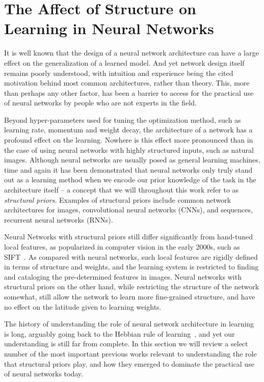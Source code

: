 \documentclass[thesis]{subfiles}
\begin{document}
	\chapter{The Affect of Structure on Learning in Neural Networks}
	\label{motivation}
	
	It is well known that the design of a neural network architecture can have a large effect on the generalization of a learned model. And yet network design itself remains poorly understood, with intuition and experience being the cited motivation behind most common architectures, rather than theory. This, more than perhaps any other factor, has been a barrier to access for the practical use of neural networks by people who are not experts in the field.
	
	Beyond hyper-parameters used for tuning the optimization method, such as learning rate, momentum and weight decay, the architecture of a network has a profound effect on the learning. Nowhere is this effect more pronounced than in the case of using neural networks with highly structured inputs, such as natural images. Although neural networks are usually posed as general learning machines, time and again it has been demonstrated that neural networks only truly stand out as a learning method when we encode our prior knowledge of the task in the architecture itself -- a concept that we will throughout this work refer to as \emph{structural priors}. Examples of structural priors include common network architectures for images, convolutional neural networks (CNNs), and sequences, recurrent neural networks (RNNs).
	
	Neural Networks with structural priors still differ significantly from hand-tuned local features, as popularized in computer vision in the early 2000s, such as SIFT~\citep{Lowe2004}. As compared with neural networks, such local features are rigidly defined in terms of structure and weights, and the learning system is restricted to finding and cataloging the pre-determined features in images. Neural networks with structural priors on the other hand, while restricting the structure of the network somewhat, still allow the network to learn more fine-grained structure, and have no effect on the latitude given to learning weights.
	
	
	The history of understanding the role of neural network architecture in learning is long, arguably going back to the Hebbian rule of learning~\citep{hebb1949organization}, and yet our understanding is still far from complete. In this section we will review a select number of the most important previous works relevant to understanding the role that structural priors play, and how they emerged to dominate the practical use of neural networks today.
	
\end{document}
